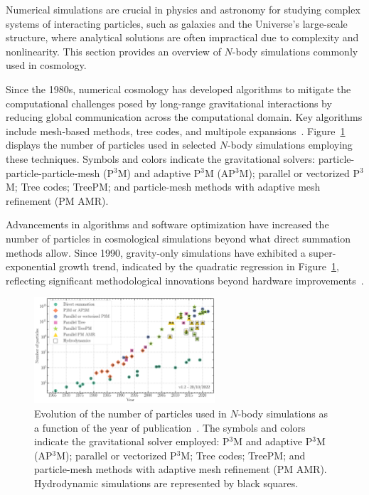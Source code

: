 Numerical simulations are crucial in physics and astronomy for studying complex systems of interacting particles, such as galaxies and the Universe's large-scale structure, where analytical solutions are often impractical due to complexity and nonlinearity. This section provides an overview of $N$-body simulations commonly used in cosmology.

Since the 1980s, numerical cosmology has developed algorithms to mitigate the computational challenges posed by long-range gravitational interactions by reducing global communication across the computational domain. Key algorithms include mesh-based methods, tree codes, and multipole expansions~\citep{1981csup.book.....H}. Figure~\ref{fig:particle-count} displays the number of particles used in selected $N$-body simulations employing these techniques. Symbols and colors indicate the gravitational solvers: particle-particle-particle-mesh (P$^3$M) and adaptive P$^3$M (AP$^3$M); parallel or vectorized P$^3$M; Tree codes; TreePM; and particle-mesh methods with adaptive mesh refinement (PM AMR).

Advancements in algorithms and software optimization have increased the number of particles in cosmological simulations beyond what direct summation methods allow. Since 1990, gravity-only simulations have exhibited a super-exponential growth trend, indicated by the quadratic regression in Figure~\ref{fig:particle-count}, reflecting significant methodological innovations beyond hardware improvements~\citep{leclercq2020}.

\begin{figure} \centering \includegraphics[width=0.6\textwidth]{figures/Moore_law_cosmosims.png} \caption[Evolution of the number of particles used in $N$-body simulations]{Evolution of the number of particles used in $N$-body simulations as a function of the year of publication~\citep{leclercq2020}. The symbols and colors indicate the gravitational solver employed: P$^3$M and adaptive P$^3$M (AP$^3$M); parallel or vectorized P$^3$M; Tree codes; TreePM; and particle-mesh methods with adaptive mesh refinement (PM AMR). Hydrodynamic simulations are represented by black squares.} \label{fig:particle-count} \end{figure}

